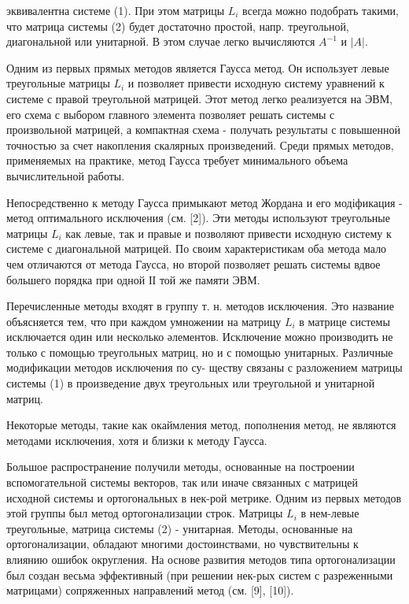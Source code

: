 \documentclass[10pt]{article}
\begin{document}
эквивалентна системе (1). При этом матрицы $L_{i}$ всегда можно подобрать такими, что матрица системы (2) будет достаточно простой, напр. треугольной, диагональной или унитарной. В этом случае легко вычисляются $A^{-1}$ и $|A|$.



Одним из первых прямых методов является Гаусса метод. Он использует левые треугольные матрицы $L_{i}$ и позволяет привести исходную систему уравнений к системе с правой треугольной матрицей. Этот метод легко реализуется на ЭВМ, его схема с выбором главного элемента позволяет решать системы с произвольной матрицей, а компактная схема - получать результаты с повышенноӥ точностью за счет накопления скалярных произведений. Среди прямых методов, применяемых на практике, метод Гаусса требует минимального объема вычислительной работы.



Непосредственно к методу Гаусса примыкают метод Жордана и его модіфикация - метод оптимального исключения (см. [2]). Эти методы используют треугольные матрицы $L_{i}$ как левые, так и правые и позволяют привести исходную систему к системе с диагональной матрицей. По своим характеристикам оба метода мало чем отличаются от метода Гаусса, но второй позволяет решать системы вдвое большего порядка при одной ІІ той же памяти ЭВМ.



Перечисленные методы входят в группу т. н. методов исключения. Это название объясняется тем, что при каждом умножении на матрицу $L_{i}$ в матрице системы исключается один или несколько әлементов. Исключение можно производить не только с помощью треугольных матриц, но и с помощью унитарных. Различные модификации методов исключения по су- ществу связаны с разложением матрицы системы (1) в произведение двух треугольных или треугольной и унитарной матриц.



Некоторые методы, такие как окаймления метод, пополнения метод, не являются методами исключения, хотя и близки к методу Гаусса.



Большое распространение получили методы, основанные на построении вспомогательной системы векторов, так или иначе связанных с матрицей исходной системы и ортогональных в нек-рой метрике. Одним из первых методов этой группы был метод ортогонализации строк. Матрицы $L_{i}$ в нем-левые треугольные, матрица системы (2) - унитарная. Методы, основанные на ортогонализации, обладают многими достоинствами, но чувствительны к влиянию ошибок округления. На основе развития методов типа ортогонализации был создан весьма эффективный (при решении нек-рых систем с разреженными матрицами) сопряженных направлений метод (см. [9], [10]).
\end{document}
